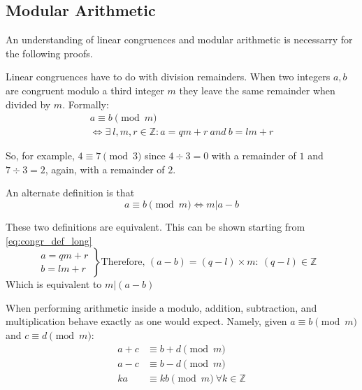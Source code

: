 \documentclass[12pt]{article}
\begin{document}
    \subsection{Modular Arithmetic}
    An understanding of linear congruences and modular arithmetic is
    necessarry for the following proofs.

    Linear congruences have to do with division remainders. When two
    integers $a, b$ are congruent modulo a third integer $m$ they leave the
    same remainder when divided by $m$. Formally:
    \begin{equation}\label{eq:congr_def_long}
        \begin{gathered}
            a \equiv b \pmod{m} \\
            \iff \exists\ l,m,r \in \mathbb{Z}: a = qm + r\ and\ b = lm + r
        \end{gathered}
    \end{equation}

    So, for example, $4 \equiv 7 \pmod{3}$ since $4 \div 3 = 0$ with
    a remainder of $1$ and $7 \div 3 = 2$, again, with a remainder of $2$.

    An alternate definition is that
    \begin{equation*}
        a \equiv b \pmod{m} \iff m | a-b
    \end{equation*}

    These two definitions are equivalent. This can be shown starting from 
    \eqref{eq:congr_def_long}
%
    \begin{equation*}
        \left. 
            \begin{aligned}
                a = qm + r\\ 
                b = lm + r
            \end{aligned}
        \right\}
        \text{Therefore, }
        (a - b) = (q-l)\times m :\: (q-l) \in \mathbb{Z}\quad
    \end{equation*}
    Which is equivalent to $m | (a-b)$

    When performing arithmetic inside a modulo, addition, subtraction, and
    multiplication behave exactly as one would expect. Namely, given
    $a\equiv b\pmod{m}$ and $c\equiv d\pmod{m}$:
    \begin{align*}
        a + c &\equiv b + d \pmod{m}\\
        a - c &\equiv b - d \pmod{m}\\
        ka 	  &\equiv kb \pmod{m}\ \forall k \in \mathbb{Z} 
    \end{align*}
\end{document}
